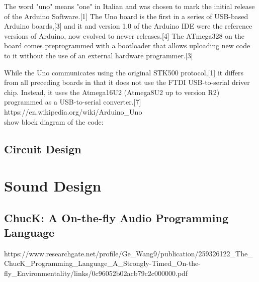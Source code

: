 The word "uno" means "one" in Italian and was chosen to mark the initial release of the 
Arduino Software.[1] The Uno board is the first in a series of USB-based Arduino boards,[3] 
and it and version 1.0 of the Arduino IDE were the reference versions of Arduino, now evolved 
to newer releases.[4] The ATmega328 on the board comes preprogrammed with a bootloader 
that allows uploading new code to it without the use of an external hardware programmer.[3]

While the Uno communicates using the original STK500 protocol,[1] it differs from all 
preceding boards in that it does not use the FTDI USB-to-serial driver chip. Instead, 
it uses the Atmega16U2 (Atmega8U2 up to version R2) programmed as a USB-to-serial converter.[7]
https://en.wikipedia.org/wiki/Arduino_Uno\\

show block diagram of the code:

\subsection{Circuit Design}

\section{Sound Design}

\subsection{ChucK: A On-the-fly Audio Programming Language}
https://www.researchgate.net/profile/Ge_Wang9/publication/259326122_The_ChucK_Programming_Language_A_Strongly-Timed_On-the-fly_Environmentality/links/0c96052b02acb79c2c000000.pdf\\

